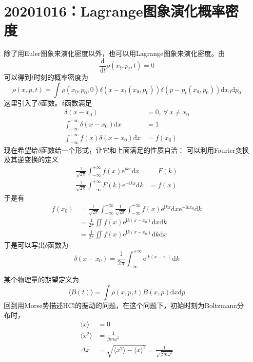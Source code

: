 \documentclass[12pt]{article}
\begin{document}
\section{20201016：Lagrange图象演化概率密度}

    除了用Euler图象来演化密度以外，也可以用Lagrange图象来演化密度。由
    \begin{equation*}
        \frac {\mathrm{d}}{\mathrm{d}t} \rho(x_t,p_t,t) = 0
    \end{equation*}
    可以得到$t$时刻的概率密度为
    \begin{equation*}
        \rho(x,p,t) = \int \rho(x_0,p_0,0)\delta(x-x_t(x_0,p_0)) \delta(p-p_t(x_0,p_0)) \mathrm{d}x_0\mathrm{d}p_0
    \end{equation*}
    这里引入了$\delta$函数。$\delta$函数满足
    \begin{align*}
        \delta(x-x_0) &= 0, \ \forall \ x \neq x_0\\
        \int_{-\infty}^{+\infty} \delta(x-x_0) \mathrm{d}x &= 1\\
        \int_{-\infty}^{+\infty} f(x)\delta(x-x_0) \mathrm{d}x &= f(x_0)
    \end{align*}
    现在希望给$\delta$函数给一个形式，让它和上面满足的性质自洽：
    可以利用Fourier变换及其逆变换的定义
    \begin{align*}
        \frac 1{\sqrt{2\pi}} \int_{-\infty}^{+\infty} f(x)\mathrm{e}^{\mathrm{i}kx}\mathrm{d}x &= F(k)\\
        \frac 1{\sqrt{2\pi}} \int_{-\infty}^{+\infty} F(k)\mathrm{e}^{-\mathrm{i}kx}\mathrm{d}k &= f(x)
    \end{align*}
    于是有
    \begin{align*}
        f(x_0) &= \frac 1{\sqrt{2\pi}} \int_{-\infty}^{+\infty} \frac 1{\sqrt{2\pi}} \int_{-\infty}^{+\infty} f(x)\mathrm{e}^{\mathrm{i}kx}\mathrm{d}x \mathrm{e}^{-\mathrm{i}kx_0}\mathrm{d}k\\
        &= \frac 1{2\pi} \iint f(x)\mathrm{e}^{\mathrm{i}k(x-x_0)}\mathrm{d}x\mathrm{d}k\\
        &= \frac 1{2\pi} \iint f(x)\mathrm{e}^{\mathrm{i}k(x-x_0)}\mathrm{d}k\mathrm{d}x
    \end{align*}
    于是可以写出$\delta$函数为
    \begin{equation*}
        \delta(x-x_0) = \frac 1{2\pi} \int_{-\infty}^{+\infty} \mathrm{e}^{\mathrm{i}k(x-x_0)}\mathrm{d}k
    \end{equation*}

    某个物理量的期望定义为
    \begin{equation*}
        \langle B(t) \rangle = \int \rho(x,p,t) B(x,p) \mathrm{d}x\mathrm{d}p
    \end{equation*}
    回到用Morse势描述HCl的振动的问题，在这个问题下，初始时刻为Boltzmann分布时，
    \begin{align*}
        \langle x \rangle &= 0\\
        \langle x^2 \rangle &= \frac 1{\beta m \omega^2}\\
        \Delta x &= \sqrt{\langle x^2 \rangle - \langle x \rangle ^2} = \frac 1{\sqrt{\beta m \omega^2}}
    \end{align*}
\end{document}
